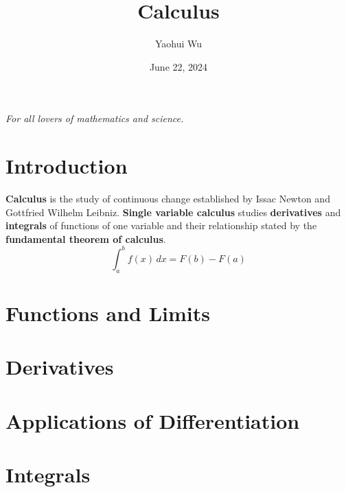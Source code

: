 \documentclass[12pt]{article}
\title{Calculus}
\author{Yaohui Wu}
\date{June 22, 2024}
\begin{document}
\maketitle

\begin{center}
    \textit{For all lovers of mathematics and science.}
\end{center}

\section*{Introduction}
\textbf{Calculus} is the study of continuous change established by Issac
Newton and Gottfried Wilhelm Leibniz.
\textbf{Single variable calculus} studies \textbf{derivatives} and
\textbf{integrals} of functions of one variable and their relationship stated
by the \textbf{fundamental theorem of calculus}.
\[\int_a^b f(x) \,dx = F(b)-F(a)\]

\tableofcontents

\newpage
\section{Functions and Limits}






\section{Derivatives}






\section{Applications of Differentiation}





\section{Integrals}




\end{document}
